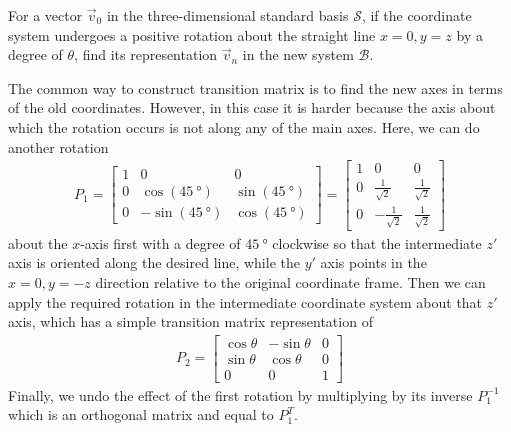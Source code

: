 \begin{exmp}
For a vector $\vec{v}_0$ in the three-dimensional standard basis $\mathcal{S}$, if the coordinate system undergoes a positive rotation about the straight line $x = 0, y = z$ by a degree of $\theta$, find its representation $\vec{v}_n$ in the new system $\mathcal{B}$.
\end{exmp}
\begin{solution}
The common way to construct transition matrix is to find the new axes in terms of the old coordinates. However, in this case it is harder because the axis about which the rotation occurs is not along any of the main axes. Here, we can do another rotation 
\begin{align*}
P_1 = 
\begin{bmatrix}
1 & 0 & 0 \\
0 & \cos(\SI{45}{\degree}) & \sin(\SI{45}{\degree}) \\
0 & -\sin(\SI{45}{\degree}) & \cos(\SI{45}{\degree})
\end{bmatrix}
=
\begin{bmatrix}
1 & 0 & 0 \\
0 & \frac{1}{\sqrt{2}} & \frac{1}{\sqrt{2}} \\
0 & -\frac{1}{\sqrt{2}} & \frac{1}{\sqrt{2}}
\end{bmatrix}
\end{align*}
about the $x$-axis first with a degree of $\SI{45}{\degree}$ clockwise so that the intermediate $z'$ axis is oriented along the desired line, while the $y'$ axis points in the $x = 0, y = -z$ direction relative to the original coordinate frame. Then we can apply the required rotation in the intermediate coordinate system about that $z'$ axis, which has a simple transition matrix representation of
\begin{align*}
P_2 =
\begin{bmatrix}
\cos \theta & -\sin \theta & 0 \\
\sin \theta & \cos \theta & 0 \\
0 & 0 & 1
\end{bmatrix}
\end{align*}
Finally, we undo the effect of the first rotation by multiplying by its inverse $P_1^{-1}$ which is an orthogonal matrix and equal to $P_1^T$. 
\begin{center}
\end{center}
\end{solution}
